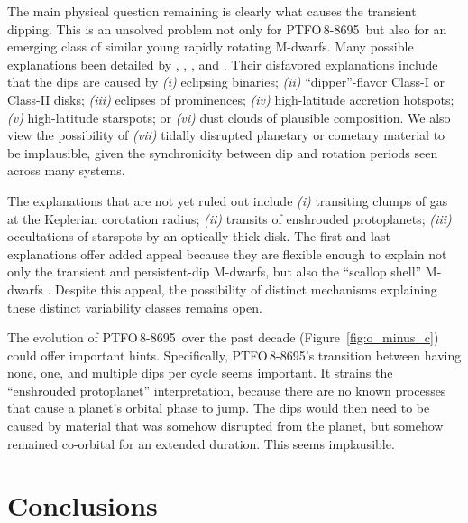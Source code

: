 \documentclass[12pt,twocolumn,tighten]{aastex62}
\newcommand{\ptfo}{PTFO$\,$8-8695}
\begin{document}
The main physical question remaining is clearly what causes the
transient dipping. This is an unsolved problem not only for \ptfo\ but
also for an emerging class of similar young rapidly rotating M-dwarfs.
Many possible explanations been detailed by \citet{rebull_rotation_2016}, \citet{david_transient_2017},
\citet{stauffer_orbiting_2017}, and \citet{zhan_complex_2019}.
Their disfavored explanations include that the dips are caused by
{\it (i)} eclipsing binaries;
{\it (ii)} ``dipper''-flavor Class-I or Class-II disks;
{\it (iii)} eclipses of prominences;
{\it (iv)} high-latitude accretion hotspots;
{\it (v)} high-latitude starspots;
or
{\it (vi)} dust clouds of plausible composition.
We also view the possibility of {\it (vii)} tidally disrupted planetary
or cometary material to be implausible, given the synchronicity
between dip and rotation periods seen across many systems.

The explanations that are not yet ruled out include
{\it (i)} transiting clumps of gas at the Keplerian corotation radius;
{\it (ii)} transits of enshrouded protoplanets;
{\it (iii)} occultations of starspots by an optically thick disk.
The first and last explanations offer added appeal because they are
flexible enough to explain not only the transient and persistent-dip
M-dwarfs, but also the ``scallop shell'' M-dwarfs
\citep{stauffer_orbiting_2017}.
Despite this appeal, the possibility of distinct mechanisms explaining
these distinct variability classes remains open.

The evolution of \ptfo\
over the past decade (Figure~\ref{fig:o_minus_c}) could offer important
hints.  Specifically, \ptfo's transition between having none, one, and
multiple dips per cycle seems important.  It strains the ``enshrouded
protoplanet'' interpretation, because there are no known processes
that cause a planet's orbital phase to jump.  The dips would then need
to be caused by material that was somehow disrupted from the planet,
but somehow remained co-orbital for an extended duration. This seems
implausible.


\section{Conclusions}
\label{sec:conclusions}
\end{document}
